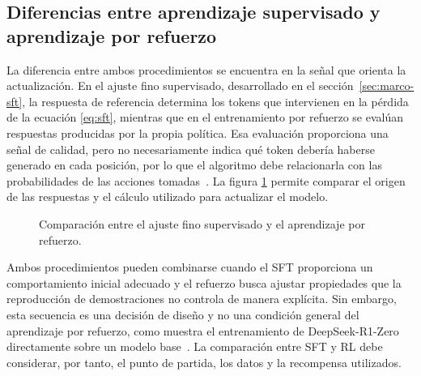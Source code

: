 \subsection{Diferencias entre aprendizaje supervisado y aprendizaje por refuerzo}
\label{sec:sft-rl}
La diferencia entre ambos procedimientos se encuentra en la señal que orienta la actualización. En el ajuste fino supervisado, desarrollado en el sección~\ref{sec:marco-sft}, la respuesta de referencia determina los tokens que intervienen en la pérdida de la ecuación \ref{eq:sft}, mientras que en el entrenamiento por refuerzo se evalúan respuestas producidas por la propia política. Esa evaluación proporciona una señal de calidad, pero no necesariamente indica qué token debería haberse generado en cada posición, por lo que el algoritmo debe relacionarla con las probabilidades de las acciones tomadas~\cite{ouyang2022instructgpt}. La figura \ref{fig:sft-rl} permite comparar el origen de las respuestas y el cálculo utilizado para actualizar el modelo.

\begin{figure}[htbp]
\centering

\caption{Comparación entre el ajuste fino supervisado y el aprendizaje por refuerzo.}
\label{fig:sft-rl}
\end{figure}

Ambos procedimientos pueden combinarse cuando el SFT proporciona un comportamiento inicial adecuado y el refuerzo busca ajustar propiedades que la reproducción de demostraciones no controla de manera explícita. Sin embargo, esta secuencia es una decisión de diseño y no una condición general del aprendizaje por refuerzo, como muestra el entrenamiento de DeepSeek-R1-Zero directamente sobre un modelo base~\cite{deepseek2025r1}. La comparación entre SFT y RL debe considerar, por tanto, el punto de partida, los datos y la recompensa utilizados.

